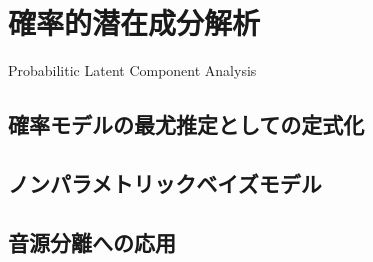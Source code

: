 \section{確率的潜在成分解析}

Probabilitic Latent Component Analysis

\subsection{確率モデルの最尤推定としての定式化}

\subsection{ノンパラメトリックベイズモデル}

\subsection{音源分離への応用}

